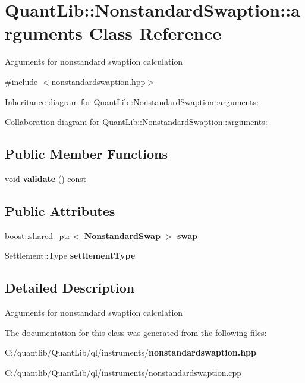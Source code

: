 \section{Quant\+Lib\+:\+:Nonstandard\+Swaption\+:\+:arguments Class Reference}
\label{class_quant_lib_1_1_nonstandard_swaption_1_1arguments}


Arguments for nonstandard swaption calculation  




{\ttfamily \#include $<$nonstandardswaption.\+hpp$>$}



Inheritance diagram for Quant\+Lib\+:\+:Nonstandard\+Swaption\+:\+:arguments\+:


Collaboration diagram for Quant\+Lib\+:\+:Nonstandard\+Swaption\+:\+:arguments\+:
\subsection*{Public Member Functions}
\begin{DoxyCompactItemize}
\item 
void {\bfseries validate} () const \label{class_quant_lib_1_1_nonstandard_swaption_1_1arguments_aa6a12151d6b7b6f91cfbaea1be3d789b}

\end{DoxyCompactItemize}
\subsection*{Public Attributes}
\begin{DoxyCompactItemize}
\item 
boost\+::shared\+\_\+ptr$<$ {\bf Nonstandard\+Swap} $>$ {\bfseries swap}\label{class_quant_lib_1_1_nonstandard_swaption_1_1arguments_a2cea7e426d2f2b04b785c9aadef3a33f}

\item 
Settlement\+::\+Type {\bfseries settlement\+Type}\label{class_quant_lib_1_1_nonstandard_swaption_1_1arguments_a644a11c3f2de52ff5acca6d7f1f9d861}

\end{DoxyCompactItemize}


\subsection{Detailed Description}
Arguments for nonstandard swaption calculation 

The documentation for this class was generated from the following files\+:\begin{DoxyCompactItemize}
\item 
C\+:/quantlib/\+Quant\+Lib/ql/instruments/{\bf nonstandardswaption.\+hpp}\item 
C\+:/quantlib/\+Quant\+Lib/ql/instruments/nonstandardswaption.\+cpp\end{DoxyCompactItemize}
